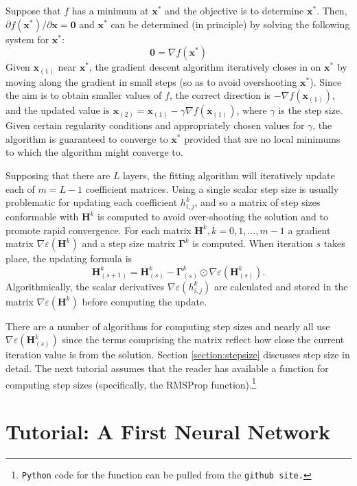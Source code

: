 \documentclass[graybox,envcountchap]{svmono}
\newcommand{\Hf}{\mathbf{H}}
\newcommand{\xf}{\mathbf{x}}
\newcommand{\tx}{\texttt}
\begin{document}
Suppose that $f$ has a minimum at $\xf^*$ and the objective is to determine $\xf^*$. Then, ${\partial f(\xf^*) }/{ \partial \xf} = \mathbf{0}$ and $\xf^*$ can be determined (in principle) by solving the following system for $\xf^*$:
\begin{equation*}
 \mathbf{0} = \nabla f(\xf^*)
\end{equation*}
Given $\xf_{(1)}$ near $\xf^*$, the gradient descent algorithm iteratively closes in on $\xf^*$ by moving along the gradient in small steps (so as to avoid overshooting $\xf^*$). 
Since the aim is to obtain smaller values of $f$, the correct direction is $ - \nabla f(\xf_{(1)})$, and the updated value is $\xf_{(2)} = \xf_{(1)} - \gamma \nabla f(\xf_{(1)})$, where $\gamma$ is the step size. Given certain regularity conditions and appropriately chosen values for $\gamma$, the algorithm is guaranteed to converge to $\xf^*$ provided that are no local minimums to which the algorithm might converge to. 

Supposing that there are $L$ layers, the fitting algorithm will iteratively update each of $m = L -1$ coefficient matrices. Using a single scalar step size is usually problematic for updating each coefficient $h^k_{i,j}$, and so a matrix of step sizes conformable with $\Hf^k$ is computed to avoid over-shooting the solution and to promote rapid convergence.     For each matrix $\Hf^k,k=0,1,\ldots,m-1$  a gradient matrix   $\nabla \varepsilon(\Hf^k)$ and a step size matrix $\mathbf{\Gamma}^k$ is computed. When iteration $s$ takes place, the updating formula is
\begin{equation}
\Hf^k_{(s+1)}  = \Hf^k_{(s)}   - \mathbf{\Gamma}_{(s)}^k \odot \nabla \varepsilon(\Hf^k_{(s)})  .
\end{equation}
Algorithmically, the scalar derivatives $ \nabla \varepsilon(h_{i,j}^k)$ are calculated and stored in the matrix $\nabla \varepsilon(\Hf^k)$ before computing the update. 

There are a number of algorithms for computing step sizes and nearly all use $\nabla \varepsilon(\Hf^k_{(s)})$ since the terms comprising the matrix reflect how close the current iteration value is from the solution.
Section \ref{section:stepsize} discusses step size in detail. The next tutorial assumes that the reader has available a function for computing step sizes (specifically, the RMSProp function).\footnote{\tx{Python} code for the function can be pulled from the \tx{github site.}}

\section{Tutorial: A First Neural Network}
\end{document}
